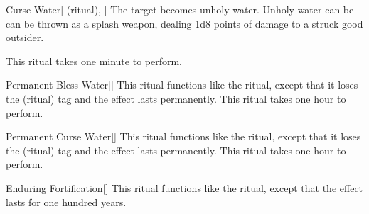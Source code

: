 \lowercase{\hypertarget{spell:Curse Water}{}}\label{spell:Curse Water}
\begin{attuneability}[Rank 1]{\hypertarget{spell:Curse Water}{Curse Water}}[ (ritual), ]
The target becomes unholy water.
Unholy water can be can be thrown as a splash weapon, dealing 1d8 points of damage to a struck good outsider.

This ritual takes one minute to perform.
\end{attuneability}
\vspace{0.25em}



\lowercase{\hypertarget{spell:Permanent Bless Water}{}}\label{spell:Permanent Bless Water}
\begin{apability}[Rank 3]{\hypertarget{spell:Permanent Bless Water}{Permanent Bless Water}}[]
This ritual functions like the  ritual, except that it loses the  (ritual) tag and the effect lasts permanently.
This ritual takes one hour to perform.
\end{apability}
\vspace{0.25em}



\lowercase{\hypertarget{spell:Permanent Curse Water}{}}\label{spell:Permanent Curse Water}
\begin{apability}[Rank 3]{\hypertarget{spell:Permanent Curse Water}{Permanent Curse Water}}[]
This ritual functions like the  ritual, except that it loses the  (ritual) tag and the effect lasts permanently.
This ritual takes one hour to perform.
\end{apability}
\vspace{0.25em}



\lowercase{\hypertarget{spell:Enduring Fortification}{}}\label{spell:Enduring Fortification}
\begin{apability}[Rank 4]{\hypertarget{spell:Enduring Fortification}{Enduring Fortification}}[]
This ritual functions like the  ritual, except that the effect lasts for one hundred years.
\end{apability}
\vspace{0.25em}



